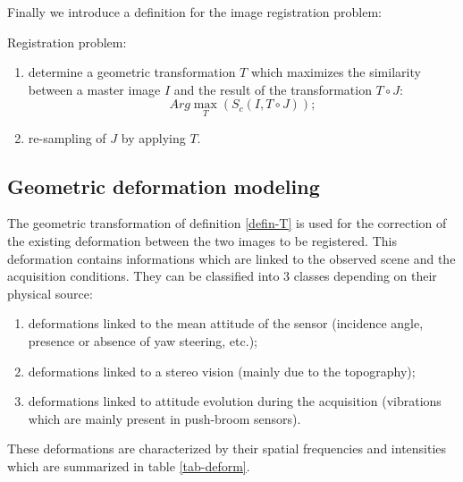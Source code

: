Finally we introduce a definition for the image registration problem:
\begin{defin}\label{defin-recal}
Registration problem: \begin{enumerate}
\item determine a geometric transformation $T$ which maximizes the
similarity between a master image $I$ and the result of the
transformation $T\circ J$:
\begin{equation}
Arg \max_T(S_c(I,T\circ J));
\end{equation}
\item re-sampling of $J$ by applying $T$.
\end{enumerate}

\end{defin}



\subsection{Geometric deformation modeling\label{sec-model}}
The geometric transformation of definition \ref{defin-T} is used for
the correction of the existing deformation between the two images to be
registered. This deformation contains informations which are linked to
the observed scene and the acquisition conditions. They
can be classified into 3 classes depending on their physical source:
\begin{enumerate}
\item deformations linked to the mean attitude of the sensor
(incidence angle, presence or absence of yaw steering, etc.);
\item deformations linked to a stereo vision (mainly due to the topography);
\item deformations linked to attitude evolution during the acquisition
(vibrations which are mainly present in push-broom sensors).
\end{enumerate}

These deformations are characterized by their spatial frequencies and
intensities which are summarized in table \ref{tab-deform}.\\

